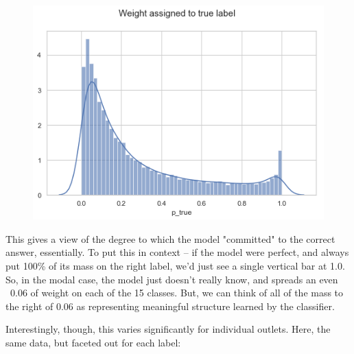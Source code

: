 \documentclass{scrartcl}
\begin{document}
\begin{figure}[H]
  \centering
  \includegraphics[width=\textwidth]{figures/ptrue-all.png}
\end{figure}

This gives a view of the degree to which the model "committed" to the correct answer, essentially. To put this in context -- if the model were perfect, and always put 100\% of its mass on the right label, we'd just see a single vertical bar at 1.0. So, in the modal case, the model just doesn't really know, and spreads an even ~0.06 of weight on each of the 15 classes. But, we can think of all of the mass to the right of 0.06 as representing meaningful structure learned by the classifier.

Interestingly, though, this varies significantly for individual outlets. Here, the same data, but faceted out for each label:
\end{document}
